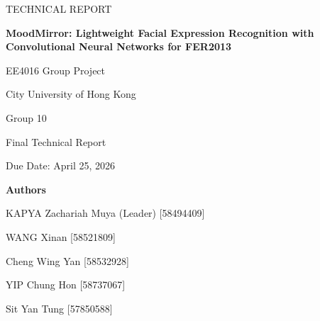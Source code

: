 \documentclass[12pt,a4paper]{article}
\begin{document}

\begin{titlepage}
\centering

{\Large TECHNICAL REPORT\par}
\vspace{1.2cm}

{\LARGE\bfseries MoodMirror: Lightweight Facial Expression Recognition with Convolutional Neural Networks for FER2013\par}
\vspace{1cm}

{\large EE4016 Group Project\par}
\vspace{0.4cm}

{\large City University of Hong Kong\par}
{\large Group 10\par}
{\large Final Technical Report\par}
\vspace{0.6cm}

{\large Due Date: April 25, 2026\par}
\vspace{1.2cm}

{\large\bfseries Authors\par}
\vspace{0.5cm}

{\large KAPYA Zachariah Muya (Leader) [58494409]\par}
{\large WANG Xinan [58521809]\par}
{\large Cheng Wing Yan [58532928]\par}
{\large YIP Chung Hon [58737067]\par}
{\large Sit Yan Tung [57850588]\par}

\vfill
\end{titlepage}

\clearpage
{}

\tableofcontents
\newpage
\end{document}
